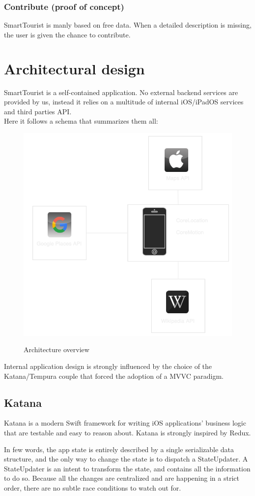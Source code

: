 \documentclass[a4paper, 11pt, parskip=half]{scrreprt}
\theoremstyle{definition}
\begin{document}
\subsection{Contribute (proof of concept)}
SmartTourist is manly based on free data. When a detailed description is missing, the user is given the chance to contribute.


\chapter{Architectural design}
SmartTourist is a self-contained application. No external backend services are provided by us, instead it relies on a multitude of internal iOS/iPadOS services and third parties API.
\\Here it follows a schema that summarizes them all:
\begin{figure}[H]
  	\centering
  	\includegraphics[width=0.5\linewidth]{ArchitectureOverview}
  	\label{fig:test1}
	\caption{Architecture overview}
\end{figure}
Internal application design is strongly influenced by the choice of the Katana/Tempura couple that forced the adoption of a MVVC paradigm.

\section{Katana}
Katana is a modern Swift framework for writing iOS applications' business logic that are testable and easy to reason about. Katana is strongly inspired by Redux.

In few words, the app state is entirely described by a single serializable data structure, and the only way to change the state is to dispatch a StateUpdater. A StateUpdater is an intent to transform the state, and contains all the information to do so. Because all the changes are centralized and are happening in a strict order, there are no subtle race conditions to watch out for.
\end{document}
